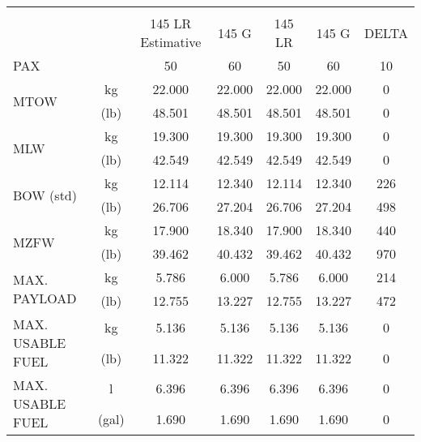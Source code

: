 \begin{table}[htbp]
\begin{tabular}{rcccccc}
    \multicolumn{7}{c}{} \\
    \multicolumn{2}{c}{} & 145 LR Estimative & 145 G & 145 LR & 145 G & DELTA \\
        \midrule
    \multicolumn{1}{l}{\multirow{2}[2]{*}{PAX}} &       & \multirow{2}[2]{*}{50} & \multirow{2}[2]{*}{60} & \multirow{2}[2]{*}{50} & \multirow{2}[2]{*}{60} & \multirow{2}[2]{*}{10} \\
    \multicolumn{1}{l}{} &       &       &       &       &       &  \\
    \multicolumn{1}{l}{\multirow{2}[2]{*}{MTOW}} & kg    & 22.000 & 22.000 & 22.000 & 22.000 & 0 \\
    \multicolumn{1}{l}{} & (lb)  & 48.501 & 48.501 & 48.501 & 48.501 & 0 \\
    \multicolumn{1}{l}{\multirow{2}[2]{*}{MLW}} & kg    & 19.300 & 19.300 & 19.300 & 19.300 & 0 \\
    \multicolumn{1}{l}{} & (lb)  & 42.549 & 42.549 & 42.549 & 42.549 & 0 \\
    \multicolumn{1}{l}{\multirow{2}[2]{*}{BOW (std)}} & kg    & 12.114 & 12.340 & 12.114 & 12.340 & 226 \\
    \multicolumn{1}{l}{} & (lb)  & 26.706 & 27.204 & 26.706 & 27.204 & 498 \\
    \multicolumn{1}{l}{\multirow{2}[2]{*}{MZFW}} & kg    & 17.900 & 18.340 & 17.900 & 18.340 & 440 \\
    \multicolumn{1}{l}{} & (lb)  & 39.462 & 40.432 & 39.462 & 40.432 & 970 \\
    \multicolumn{1}{l}{\multirow{2}[2]{*}{MAX. PAYLOAD}} & kg    & 5.786 & 6.000 & 5.786 & 6.000 & 214 \\
    \multicolumn{1}{l}{} & (lb)  & 12.755 & 13.227 & 12.755 & 13.227 & 472 \\
    \multicolumn{1}{l}{\multirow{2}[2]{*}{MAX. USABLE FUEL}} & kg    & 5.136 & 5.136 & 5.136 & 5.136 & 0 \\
    \multicolumn{1}{l}{} & (lb)  & 11.322 & 11.322 & 11.322 & 11.322 & 0 \\
    \multicolumn{1}{l}{\multirow{2}[2]{*}{MAX. USABLE FUEL}} & l     & 6.396 & 6.396 & 6.396 & 6.396 & 0 \\
    \multicolumn{1}{l}{} & (gal) & 1.690 & 1.690 & 1.690 & 1.690 & 0 \\
    \bottomrule
    \end{tabular}%
  \label{tab:addlabel}%
\end{table}%




